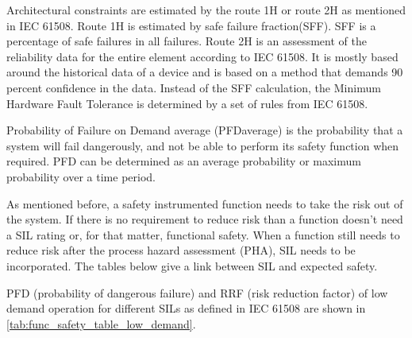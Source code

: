 Architectural constraints are estimated by the route 1H or route 2H as mentioned in IEC 61508. Route 1H is estimated by safe failure fraction(SFF). SFF is a percentage of safe failures in all failures. Route 2H is an assessment of the reliability data for the entire element according to IEC 61508. It is mostly based around the historical data of a device and is based on a method that demands 90 percent confidence in the data.  Instead of the SFF calculation, the Minimum Hardware Fault Tolerance is determined by a set of rules from IEC 61508.

Probability of Failure on Demand average (PFDaverage) is the probability that a system will fail dangerously, and not be able to perform its safety function when required. PFD can be determined as an average probability or maximum probability over a time period.

As mentioned before, a safety instrumented function needs to take the risk out of the system. If there is no requirement to reduce risk than a function doesn't need a SIL rating or, for that matter, functional safety. When a function still needs to reduce risk after the process hazard assessment (PHA), SIL needs to be incorporated. The tables below give a link between SIL and expected safety.

PFD (probability of dangerous failure) and RRF (risk reduction factor) of low demand operation for different SILs as defined in IEC 61508 are shown in \autoref{tab:func_safety_table_low_demand}.

\begin{table}[H]
\centering
{}
\caption{Link between SIL, PFH and RRF for low demand operation}
\label{tab:func_safety_table_low_demand}
\end{table}

